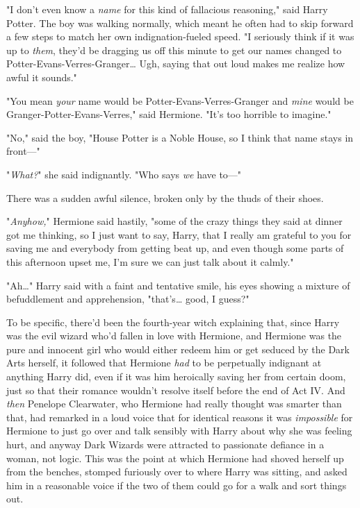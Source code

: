 "I don't even know a \emph{name} for this kind of fallacious reasoning," said 
Harry Potter. The boy was walking normally, which meant he often had to skip 
forward a few steps to match her own indignation-fueled speed. "I seriously 
think if it was up to \emph{them}, they'd be dragging us off this minute to get 
our names changed to Potter-Evans-Verres-Granger{\ldots} Ugh, saying that out 
loud makes me realize how awful it sounds."

"You mean \emph{your} name would be Potter-Evans-Verres-Granger and \emph{mine} 
would be Granger-Potter-Evans-Verres," said Hermione. "It's too horrible to 
imagine."

"No," said the boy, "House Potter is a Noble House, so I think that name stays 
in front---"

"\emph{What?}" she said indignantly. "Who says \emph{we} have to---"

There was a sudden awful silence, broken only by the thuds of their shoes.

"\emph{Anyhow,}" Hermione said hastily, "some of the crazy things they said at 
dinner got me thinking, so I just want to say, Harry, that I really am grateful 
to you for saving me and everybody from getting beat up, and even though some 
parts of this afternoon upset me, I'm sure we can just talk about it calmly."

"Ah{\ldots}" Harry said with a faint and tentative smile, his eyes showing a 
mixture of befuddlement and apprehension, "that's{\ldots} good, I guess?"

To be specific, there'd been the fourth-year witch explaining that, since Harry 
was the evil wizard who'd fallen in love with Hermione, and Hermione was the 
pure and innocent girl who would either redeem him or get seduced by the Dark 
Arts herself, it followed that Hermione \emph{had} to be perpetually indignant 
at anything Harry did, even if it was him heroically saving her from certain 
doom, just so that their romance wouldn't resolve itself before the end of Act 
IV. And \emph{then} Penelope Clearwater, who Hermione had really thought was 
smarter than that, had remarked in a loud voice that for identical reasons it 
was \emph{impossible} for Hermione to just go over and talk sensibly with Harry 
about why she was feeling hurt, and anyway Dark Wizards were attracted to 
passionate defiance in a woman, not logic. This was the point at which Hermione 
had shoved herself up from the benches, stomped furiously over to where Harry 
was sitting, and asked him in a reasonable voice if the two of them could go 
for a walk and sort things out.

